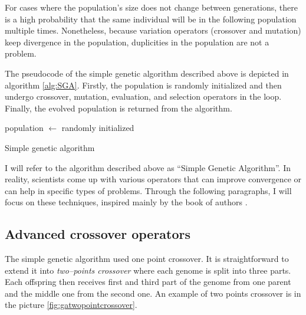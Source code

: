 For cases where the population's size does not change between generations, there is a high probability that the same individual will be in the following population multiple times. Nonetheless, because variation operators (crossover and mutation) keep divergence in the population, duplicities in the population are not a problem.

The pseudocode of the simple genetic algorithm described above is depicted in algorithm \ref{alg:SGA}. Firstly, the population is randomly initialized and then undergo crossover, mutation, evaluation, and selection operators in the loop. Finally, the evolved population is returned from the algorithm.

\begin{algorithm}
    population $\leftarrow$ randomly initialized\;
    \caption{Simple genetic algorithm}
    \label{alg:SGA}
\end{algorithm}

I will refer to the algorithm described above as \enquote{Simple Genetic Algorithm}. In reality, scientists come up with various operators that can improve convergence or can help in specific types of problems. Through the following paragraphs, I will focus on these techniques, inspired mainly by the book of authors \citet*{IntroToGA}.

\subsection{Advanced crossover operators}

The simple genetic algorithm used one point crossover. It is straightforward to extend it into \emph{two--points crossover} where each genome is split into three parts. Each offspring then receives first and third part of the genome from one parent and the middle one from the second one. An example of two points crossover is in the picture \ref{fig:gatwopointcrossover}.

